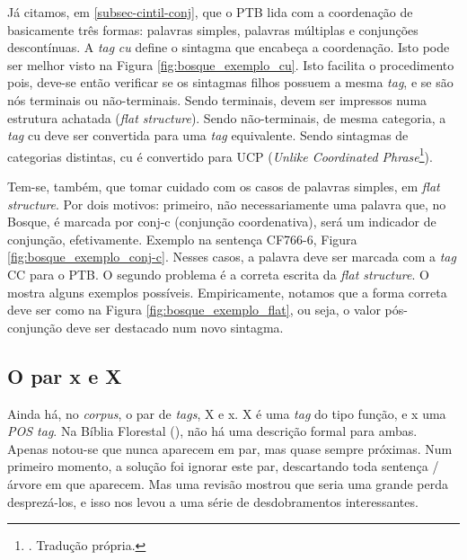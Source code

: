 Já citamos, em \ref{subsec-cintil-conj}, que o PTB lida com a coordenação de basicamente três formas: palavras simples, palavras múltiplas e conjunções descontínuas. A \textit{tag} \textit{cu} define o sintagma que encabeça a coordenação. Isto pode ser melhor visto na Figura \ref{fig:bosque_exemplo_cu}. Isto facilita o procedimento pois, deve-se então verificar se os sintagmas filhos possuem a mesma \textit{tag}, e se são nós terminais ou não-terminais. Sendo terminais, devem ser impressos numa estrutura achatada (\textit{flat structure}). Sendo não-terminais, de mesma categoria, a \textit{tag} cu deve ser convertida para uma \textit{tag} equivalente. Sendo sintagmas de categorias distintas, cu é convertido para UCP (\textit{Unlike Coordinated Phrase}\footnote{. Tradução própria.}).
\begin{center}
    
\end{center}

Tem-se, também, que tomar cuidado com os casos de palavras simples, em \textit{flat structure}. Por dois motivos: primeiro, não necessariamente uma palavra que, no Bosque, é marcada por conj-c (conjunção coordenativa), será um indicador de conjunção, efetivamente. Exemplo na sentença CF766-6, Figura \ref{fig:bosque_exemplo_conj-c}. Nesses casos, a palavra deve ser marcada com a \textit{tag} CC para o PTB. O segundo problema é a correta escrita da \textit{flat structure}. O \cite[p~117]{bracketing_ptb}  mostra alguns exemplos possíveis. Empiricamente, notamos que a forma correta deve ser como na Figura \ref{fig:bosque_exemplo_flat}, ou seja, o valor pós-conjunção deve ser destacado num novo sintagma.
\begin{center}
    
\end{center}
\subsection{O par \textbf{x} e \textbf{X}}
\label{subsec:sec_x}
Ainda há, no \textit{corpus}, o par de \textit{tags}, X e x. X é uma \textit{tag} do tipo função, e x uma \textit{POS tag}. Na Bíblia Florestal (\cite{freitas2007biblia}), não há uma descrição formal para ambas. Apenas notou-se que nunca aparecem em par, mas quase sempre próximas. Num primeiro momento, a solução foi ignorar este par, descartando toda sentença / árvore em que aparecem. Mas uma revisão mostrou que seria uma grande perda desprezá-los, e isso nos levou a uma série de desdobramentos interessantes.
\begin{center}
    
\end{center}

